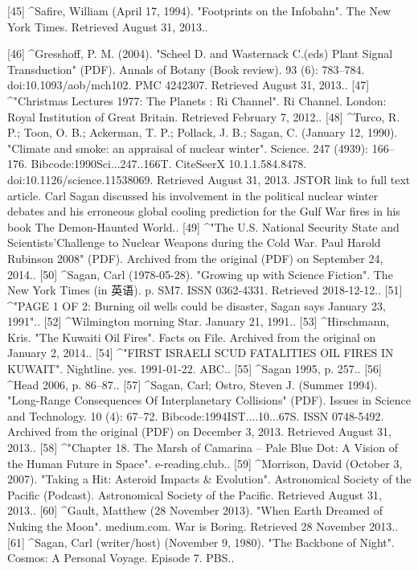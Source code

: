 [45]
^Safire, William (April 17, 1994). "Footprints on the Infobahn". The New York Times. Retrieved August 31, 2013..

[46]
^Gresshoff, P. M. (2004). "Scheel D. and Wasternack C.(eds) Plant Signal Transduction" (PDF). Annals of Botany (Book review). 93 (6): 783–784. doi:10.1093/aob/mch102. PMC 4242307. Retrieved August 31, 2013..
[47]
^"Christmas Lectures 1977: The Planets : Ri Channel". Ri Channel. London: Royal Institution of Great Britain. Retrieved February 7, 2012..
[48]
^Turco, R. P.; Toon, O. B.; Ackerman, T. P.; Pollack, J. B.; Sagan, C. (January 12, 1990). "Climate and smoke: an appraisal of nuclear winter". Science. 247 (4939): 166–176. Bibcode:1990Sci...247..166T. CiteSeerX 10.1.1.584.8478. doi:10.1126/science.11538069. Retrieved August 31, 2013. JSTOR link to full text article. Carl Sagan discussed his involvement in the political nuclear winter debates and his erroneous global cooling prediction for the Gulf War fires in his book The Demon-Haunted World..
[49]
^"The U.S. National Security State and Scientists'Challenge to Nuclear Weapons during the Cold War. Paul Harold Rubinson 2008" (PDF). Archived from the original (PDF) on September 24, 2014..
[50]
^Sagan, Carl (1978-05-28). "Growing up with Science Fiction". The New York Times (in 英语). p. SM7. ISSN 0362-4331. Retrieved 2018-12-12..
[51]
^"PAGE 1 OF 2: Burning oil wells could be disaster, Sagan says January 23, 1991"..
[52]
^Wilmington morning Star. January 21, 1991..
[53]
^Hirschmann, Kris. "The Kuwaiti Oil Fires". Facts on File. Archived from the original on January 2, 2014..
[54]
^"FIRST ISRAELI SCUD FATALITIES OIL FIRES IN KUWAIT". Nightline. yes. 1991-01-22. ABC..
[55]
^Sagan 1995, p. 257..
[56]
^Head 2006, p. 86–87..
[57]
^Sagan, Carl; Ostro, Steven J. (Summer 1994). "Long-Range Consequences Of Interplanetary Collisions" (PDF). Issues in Science and Technology. 10 (4): 67–72. Bibcode:1994IST....10...67S. ISSN 0748-5492. Archived from the original (PDF) on December 3, 2013. Retrieved August 31, 2013..
[58]
^"Chapter 18. The Marsh of Camarina – Pale Blue Dot: A Vision of the Human Future in Space". e-reading.club..
[59]
^Morrison, David (October 3, 2007). "Taking a Hit: Asteroid Impacts & Evolution". Astronomical Society of the Pacific (Podcast). Astronomical Society of the Pacific. Retrieved August 31, 2013..
[60]
^Gault, Matthew (28 November 2013). "When Earth Dreamed of Nuking the Moon". medium.com. War is Boring. Retrieved 28 November 2013..
[61]
^Sagan, Carl (writer/host) (November 9, 1980). "The Backbone of Night". Cosmos: A Personal Voyage. Episode 7. PBS..
